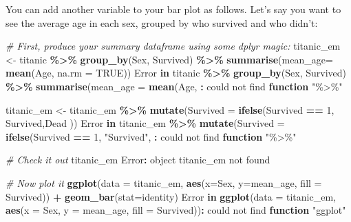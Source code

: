 \documentclass[
]{book}
\newenvironment{Shaded}{\begin{snugshade}}{\end{snugshade}}
\newcommand{\AttributeTok}[1]{\textcolor[rgb]{0.13,0.29,0.53}{#1}}
\newcommand{\CommentTok}[1]{\textcolor[rgb]{0.56,0.35,0.01}{\textit{#1}}}
\newcommand{\ConstantTok}[1]{\textcolor[rgb]{0.56,0.35,0.01}{#1}}
\newcommand{\ControlFlowTok}[1]{\textcolor[rgb]{0.13,0.29,0.53}{\textbf{#1}}}
\newcommand{\DecValTok}[1]{\textcolor[rgb]{0.00,0.00,0.81}{#1}}
\newcommand{\FunctionTok}[1]{\textcolor[rgb]{0.13,0.29,0.53}{\textbf{#1}}}
\newcommand{\NormalTok}[1]{#1}
\newcommand{\OtherTok}[1]{\textcolor[rgb]{0.56,0.35,0.01}{#1}}
\newcommand{\SpecialCharTok}[1]{\textcolor[rgb]{0.81,0.36,0.00}{\textbf{#1}}}
\newcommand{\StringTok}[1]{\textcolor[rgb]{0.31,0.60,0.02}{#1}}
\begin{document}
You can add another variable to your bar plot as follows. Let's say you want to see the average age in each sex, grouped by who survived and who didn't:

\begin{Shaded}
\begin{Highlighting}[]
\CommentTok{\# First, produce your summary dataframe using some dplyr magic:}
\NormalTok{titanic\_em }\OtherTok{\textless{}{-}}\NormalTok{ titanic }\SpecialCharTok{\%\textgreater{}\%} 
  \FunctionTok{group\_by}\NormalTok{(Sex, Survived) }\SpecialCharTok{\%\textgreater{}\%} 
  \FunctionTok{summarise}\NormalTok{(}\AttributeTok{mean\_age=} \FunctionTok{mean}\NormalTok{(Age, }\AttributeTok{na.rm =} \ConstantTok{TRUE}\NormalTok{))}
\NormalTok{Error }\ControlFlowTok{in}\NormalTok{ titanic }\SpecialCharTok{\%\textgreater{}\%} \FunctionTok{group\_by}\NormalTok{(Sex, Survived) }\SpecialCharTok{\%\textgreater{}\%} \FunctionTok{summarise}\NormalTok{(}\AttributeTok{mean\_age =} \FunctionTok{mean}\NormalTok{(Age, }\SpecialCharTok{:}\NormalTok{ could not find }\ControlFlowTok{function} \StringTok{"\%\textgreater{}\%"}

\NormalTok{titanic\_em }\OtherTok{\textless{}{-}}\NormalTok{ titanic\_em }\SpecialCharTok{\%\textgreater{}\%} 
  \FunctionTok{mutate}\NormalTok{(}\AttributeTok{Survived =} \FunctionTok{ifelse}\NormalTok{(Survived }\SpecialCharTok{==} \DecValTok{1}\NormalTok{, }\StringTok{\textquotesingle{}Survived\textquotesingle{}}\NormalTok{,}\StringTok{\textquotesingle{}Dead\textquotesingle{}}\NormalTok{ ))}
\NormalTok{Error }\ControlFlowTok{in}\NormalTok{ titanic\_em }\SpecialCharTok{\%\textgreater{}\%} \FunctionTok{mutate}\NormalTok{(}\AttributeTok{Survived =} \FunctionTok{ifelse}\NormalTok{(Survived }\SpecialCharTok{==} \DecValTok{1}\NormalTok{, }\StringTok{"Survived"}\NormalTok{, }\SpecialCharTok{:}\NormalTok{ could not find }\ControlFlowTok{function} \StringTok{"\%\textgreater{}\%"}

\CommentTok{\# Check it out}
\NormalTok{titanic\_em}
\NormalTok{Error}\SpecialCharTok{:}\NormalTok{ object }\StringTok{\textquotesingle{}titanic\_em\textquotesingle{}}\NormalTok{ not found}

\CommentTok{\# Now plot it}
\FunctionTok{ggplot}\NormalTok{(}\AttributeTok{data =}\NormalTok{ titanic\_em, }
       \FunctionTok{aes}\NormalTok{(}\AttributeTok{x=}\NormalTok{Sex, }\AttributeTok{y=}\NormalTok{mean\_age, }\AttributeTok{fill =}\NormalTok{ Survived)) }\SpecialCharTok{+}
  \FunctionTok{geom\_bar}\NormalTok{(}\AttributeTok{stat=}\StringTok{\textquotesingle{}identity\textquotesingle{}}\NormalTok{)}
\NormalTok{Error }\ControlFlowTok{in} \FunctionTok{ggplot}\NormalTok{(}\AttributeTok{data =}\NormalTok{ titanic\_em, }\FunctionTok{aes}\NormalTok{(}\AttributeTok{x =}\NormalTok{ Sex, }\AttributeTok{y =}\NormalTok{ mean\_age, }\AttributeTok{fill =}\NormalTok{ Survived))}\SpecialCharTok{:}\NormalTok{ could not find }\ControlFlowTok{function} \StringTok{"ggplot"}
\end{Highlighting}
\end{Shaded}
\end{document}
